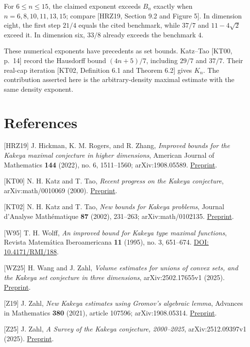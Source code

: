 \documentclass[
  11pt,
  a4paper,
]{article}
\begin{document}
For \(6\le n\le15\), the claimed exponent exceeds \(B_n\) exactly when
\(n=6,8,10,11,13,15\); compare {[}HRZ19, Section 9.2 and Figure 5{]}. In
dimension eight, the first step \(21/4\) equals the cited benchmark,
while \(37/7\) and \(11-4\sqrt2\) exceed it. In dimension six, \(33/8\)
already exceeds the benchmark \(4\).

These numerical exponents have precedents as set bounds. Katz--Tao
{[}KT00, p.~14{]} record the Hausdorff bound \((4n+5)/7\), including
\(29/7\) and \(37/7\). Their real-cap iteration {[}KT02, Definition 6.1
and Theorem 6.2{]} gives \(K_n\). The contribution asserted here is the
arbitrary-density maximal estimate with the same density exponent.

\hypertarget{references}{%
\section{References}\label{references}}

{[}HRZ19{]} J. Hickman, K. M. Rogers, and R. Zhang, \emph{Improved
bounds for the Kakeya maximal conjecture in higher dimensions}, American
Journal of Mathematics \textbf{144} (2022), no. 6, 1511--1560;
arXiv:1908.05589. \href{https://arxiv.org/abs/1908.05589}{Preprint}.

{[}KT00{]} N. H. Katz and T. Tao, \emph{Recent progress on the Kakeya
conjecture}, arXiv:math/0010069 (2000).
\href{https://arxiv.org/abs/math/0010069}{Preprint}.

{[}KT02{]} N. H. Katz and T. Tao, \emph{New bounds for Kakeya problems},
Journal d'Analyse Mathématique \textbf{87} (2002), 231--263;
arXiv:math/0102135. \href{https://arxiv.org/abs/math/0102135}{Preprint}.

{[}W95{]} T. H. Wolff, \emph{An improved bound for Kakeya type maximal
functions}, Revista Matemática Iberoamericana \textbf{11} (1995), no. 3,
651--674. \href{https://doi.org/10.4171/RMI/188}{DOI: 10.4171/RMI/188}.

{[}WZ25{]} H. Wang and J. Zahl, \emph{Volume estimates for unions of
convex sets, and the Kakeya set conjecture in three dimensions},
arXiv:2502.17655v1 (2025).
\href{https://arxiv.org/abs/2502.17655v1}{Preprint}.

{[}Z19{]} J. Zahl, \emph{New Kakeya estimates using Gromov's algebraic
lemma}, Advances in Mathematics \textbf{380} (2021), article 107596;
arXiv:1908.05314. \href{https://arxiv.org/abs/1908.05314}{Preprint}.

{[}Z25{]} J. Zahl, \emph{A Survey of the Kakeya conjecture, 2000--2025},
arXiv:2512.09397v1 (2025).
\href{https://arxiv.org/abs/2512.09397v1}{Preprint}.
\end{document}
